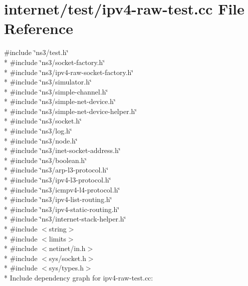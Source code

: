 \hypertarget{ipv4-raw-test_8cc}{}\section{internet/test/ipv4-\/raw-\/test.cc File Reference}
\label{ipv4-raw-test_8cc}
{\ttfamily \#include \char`\"{}ns3/test.\+h\char`\"{}}\\*
{\ttfamily \#include \char`\"{}ns3/socket-\/factory.\+h\char`\"{}}\\*
{\ttfamily \#include \char`\"{}ns3/ipv4-\/raw-\/socket-\/factory.\+h\char`\"{}}\\*
{\ttfamily \#include \char`\"{}ns3/simulator.\+h\char`\"{}}\\*
{\ttfamily \#include \char`\"{}ns3/simple-\/channel.\+h\char`\"{}}\\*
{\ttfamily \#include \char`\"{}ns3/simple-\/net-\/device.\+h\char`\"{}}\\*
{\ttfamily \#include \char`\"{}ns3/simple-\/net-\/device-\/helper.\+h\char`\"{}}\\*
{\ttfamily \#include \char`\"{}ns3/socket.\+h\char`\"{}}\\*
{\ttfamily \#include \char`\"{}ns3/log.\+h\char`\"{}}\\*
{\ttfamily \#include \char`\"{}ns3/node.\+h\char`\"{}}\\*
{\ttfamily \#include \char`\"{}ns3/inet-\/socket-\/address.\+h\char`\"{}}\\*
{\ttfamily \#include \char`\"{}ns3/boolean.\+h\char`\"{}}\\*
{\ttfamily \#include \char`\"{}ns3/arp-\/l3-\/protocol.\+h\char`\"{}}\\*
{\ttfamily \#include \char`\"{}ns3/ipv4-\/l3-\/protocol.\+h\char`\"{}}\\*
{\ttfamily \#include \char`\"{}ns3/icmpv4-\/l4-\/protocol.\+h\char`\"{}}\\*
{\ttfamily \#include \char`\"{}ns3/ipv4-\/list-\/routing.\+h\char`\"{}}\\*
{\ttfamily \#include \char`\"{}ns3/ipv4-\/static-\/routing.\+h\char`\"{}}\\*
{\ttfamily \#include \char`\"{}ns3/internet-\/stack-\/helper.\+h\char`\"{}}\\*
{\ttfamily \#include $<$string$>$}\\*
{\ttfamily \#include $<$limits$>$}\\*
{\ttfamily \#include $<$netinet/in.\+h$>$}\\*
{\ttfamily \#include $<$sys/socket.\+h$>$}\\*
{\ttfamily \#include $<$sys/types.\+h$>$}\\*
Include dependency graph for ipv4-\/raw-\/test.cc\+:

